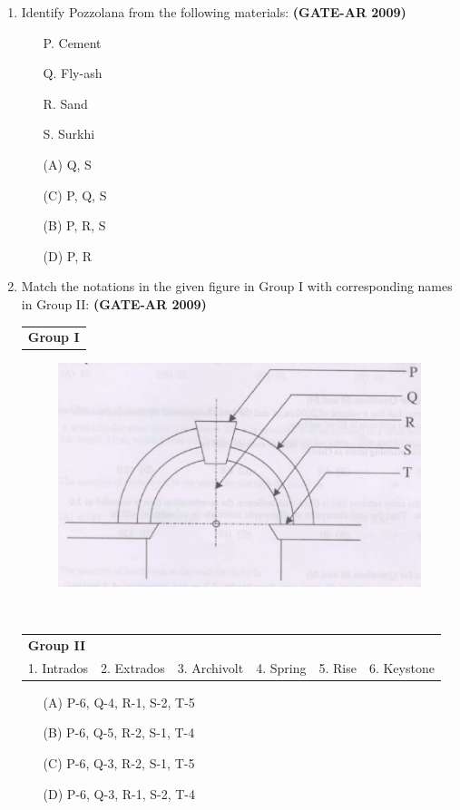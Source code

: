 \documentclass[a4paper,10pt]{article}
\begin{document}
\begin{enumerate}
    \item Identify Pozzolana from the following materials: \hfill \textbf{(GATE-AR 2009)}
    \begin{itemize}
        \item[P.] Cement
        \item[Q.] Fly-ash
        \item[R.] Sand
        \item[S.] Surkhi
    \end{itemize}
    \begin{multicols}{2}
	\begin{itemize}
        \item[(A)] Q, S
        \item[(C)] P, Q, S
        \item[(B)] P, R, S
        \item[(D)] P, R
    \end{itemize}
	\end{multicols}

	\item Match the notations in the given figure in Group I with corresponding names in Group II: \hfill \textbf{(GATE-AR 2009)} \\
    \begin{tabular}{ p }
	\textbf{Group I} \\
	\end{tabular}
	\begin{figure}[h!]
        \centering
        \includegraphics[width=0.5\linewidth]{figs/img_04.jpg}
        \label{fig:Img04}
	\end{figure} \\
	\begin{tabular}{ p p p p p p }
	\textbf{Group II} & & & & & \\
	1. Intrados & 2. Extrados & 3. Archivolt & 4. Spring & 5. Rise & 6. Keystone \\
	\end{tabular}	
	\begin{itemize}
        \item[(A)] P-6, Q-4, R-1, S-2, T-5
        \item[(B)] P-6, Q-5, R-2, S-1, T-4
        \item[(C)] P-6, Q-3, R-2, S-1, T-5
        \item[(D)] P-6, Q-3, R-1, S-2, T-4
    \end{itemize}


\end{enumerate}
\end{document}
